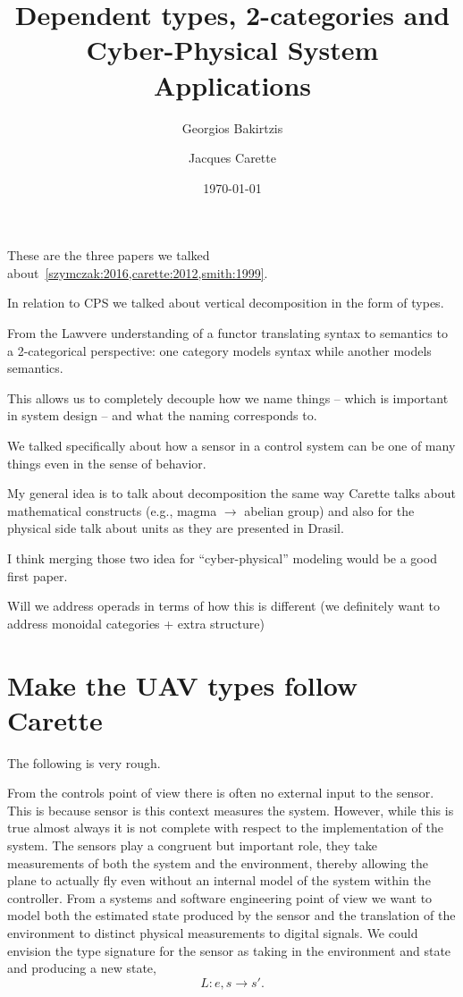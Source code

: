 \documentclass{article}
\title{Dependent types, 2-categories and Cyber-Physical System Applications}
\author{Georgios Bakirtzis \and Jacques Carette}
\date{\today}
\begin{document}
\maketitle

These are the three papers we talked about~\ref{szymczak:2016,carette:2012,smith:1999}.

In relation to CPS we talked about vertical decomposition
in the form of types.

From the Lawvere understanding
of a functor translating syntax to semantics
to a 2-categorical perspective:
one category models syntax while another models semantics.

This allows us to completely decouple how we name things -- which is important
in system design -- and what the naming corresponds to.

We talked specifically about how a sensor
in a control system can be one of many things even
in the sense of behavior.

My general idea is
to talk about decomposition the same way Carette talks about mathematical constructs
(e.g., magma $\rightarrow$ abelian group)
and also for the physical side talk about units as they are presented
in Drasil.

I think merging those two idea for ``cyber-physical'' modeling would be a good first paper.

Will we address operads in terms
of how this is different (we definitely want to address
monoidal categories + extra structure)
\section{Make the UAV types follow Carette}

The following is very rough.

From the controls point
of view there is often no external input to the sensor.
This is because sensor is this context measures the system.
However, while this is true almost always it is not complete
with respect to the implementation of the system.
The sensors play a congruent but important role,
they take measurements of both the system
and the environment, thereby allowing the plane to actually fly
even without an internal model of the system within the controller.
From a systems and software engineering point of view we want to model both
the estimated state produced by the sensor and the translation
of the environment to distinct physical measurements
to digital signals.
We could envision the type signature for the sensor as
taking in the environment and state and producing a new state,
\[{L}: e, s \rightarrow s'.\]
\end{document}
